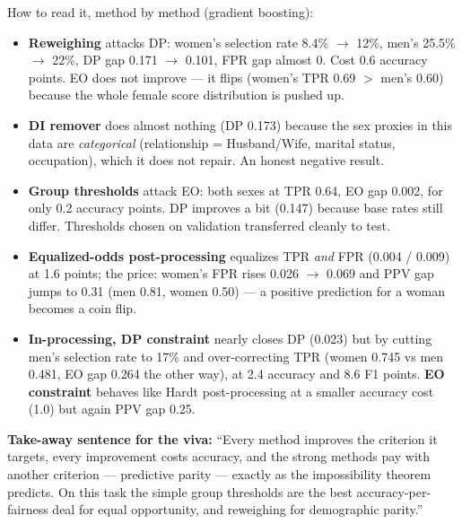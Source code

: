 \documentclass[11pt,a4paper]{article}
\begin{document}
How to read it, method by method (gradient boosting):
\begin{itemize}
  \item \textbf{Reweighing} attacks DP: women's selection rate 8.4\% $\to$ 12\%, men's 25.5\% $\to$ 22\%, DP gap 0.171 $\to$ 0.101, FPR gap almost 0. Cost 0.6 accuracy points. EO does not improve --- it flips (women's TPR 0.69 $>$ men's 0.60) because the whole female score distribution is pushed up.
  \item \textbf{DI remover} does almost nothing (DP 0.173) because the sex proxies in this data are \emph{categorical} (relationship = Husband/Wife, marital status, occupation), which it does not repair. An honest negative result.
  \item \textbf{Group thresholds} attack EO: both sexes at TPR 0.64, EO gap 0.002, for only 0.2 accuracy points. DP improves a bit (0.147) because base rates still differ. Thresholds chosen on validation transferred cleanly to test.
  \item \textbf{Equalized-odds post-processing} equalizes TPR \emph{and} FPR (0.004 / 0.009) at 1.6 points; the price: women's FPR rises 0.026 $\to$ 0.069 and PPV gap jumps to 0.31 (men 0.81, women 0.50) --- a positive prediction for a woman becomes a coin flip.
  \item \textbf{In-processing, DP constraint} nearly closes DP (0.023) but by cutting men's selection rate to 17\% and over-correcting TPR (women 0.745 vs men 0.481, EO gap 0.264 the other way), at 2.4 accuracy and 8.6 F1 points. \textbf{EO constraint} behaves like Hardt post-processing at a smaller accuracy cost (1.0) but again PPV gap 0.25.
\end{itemize}

\begin{key}
\textbf{Take-away sentence for the viva:} ``Every method improves the criterion it targets, every improvement costs accuracy, and the strong methods pay with another criterion --- predictive parity --- exactly as the impossibility theorem predicts. On this task the simple group thresholds are the best accuracy-per-fairness deal for equal opportunity, and reweighing for demographic parity.''
\end{key}

\end{document}
